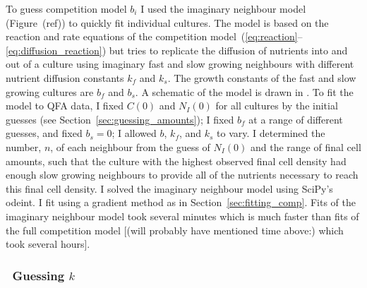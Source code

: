 To guess competition model \(b_{i}\) I used the imaginary neighbour
model (Figure~(ref)) to quickly fit individual cultures. The model is
based on the reaction and rate equations of the competition
model~(\ref{eq:reaction}--\ref{eq:diffusion_reaction}) but tries to
replicate the diffusion of nutrients into and out of a culture using
imaginary fast and slow growing neighbours with different nutrient
diffusion constants \(k_{f}\) and \(k_{s}\). The growth constants of
the fast and slow growing cultures are \(b_{f}\) and \(b_{s}\). A
schematic of the model is drawn in . To fit the model to QFA data, I
fixed \(C(0)\) and \(N_{I}(0)\) for all cultures by the initial
guesses (see Section~\ref{sec:guessing_amounts}); I fixed \(b_{f}\) at
a range of different guesses, and fixed \(b_{s} = 0\); I allowed
\(b\), \(k_{f}\), and \(k_{s}\) to vary. I determined the number,
\(n\), of each neighbour from the guess of \(N_{I}(0)\) and the range
of final cell amounts, such that the culture with the highest observed
final cell density had enough slow growing neighbours to provide all
of the nutrients necessary to reach this final cell density. I solved
the imaginary neighbour model using SciPy's odeint. I fit using a
gradient method as in Section~\ref{sec:fitting_comp}. Fits of the
imaginary neighbour model took several minutes which is much faster
than fits of the full competition model [(will probably have mentioned
time above:) which took several hours].


\subsubsection{\boldmath \thesubsubsection~Guessing \({k}\) \unboldmath}

